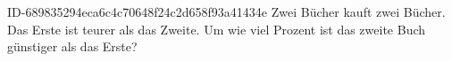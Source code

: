 \begin{exercise}
      {ID-689835294eca6c4c70648f24c2d658f93a41434e}
      {Zwei Bücher}
  \ifproblem\problem
    \xya{} kauft zwei Bücher. Das Erste ist  teurer als das Zweite.
    Um wie viel Prozent ist das zweite Buch günstiger als das Erste?
  \fi
\end{exercise}
